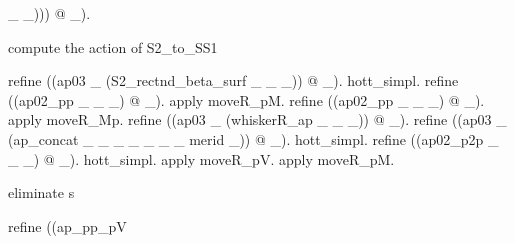 \begin{coqdoccode}
\begin{coqdoccomment}
\_\coqdocindent{0.50em}
\_)))\coqdocindent{0.50em}
@\coqdocindent{0.50em}
\_).\coqdoceol
\coqdoceol
\coqdocindent{1.00em}
\begin{coqdoccomment}
\coqdocindent{0.50em}
compute\coqdocindent{0.50em}
the\coqdocindent{0.50em}
action\coqdocindent{0.50em}
of\coqdocindent{0.50em}
S2\_to\_SS1\coqdocindent{0.50em}
\end{coqdoccomment}
\coqdoceol
\coqdocindent{1.00em}
refine\coqdocindent{0.50em}
((ap03\coqdocindent{0.50em}
\_\coqdocindent{0.50em}
(S2\_rectnd\_beta\_surf\coqdocindent{0.50em}
\_\coqdocindent{0.50em}
\_\coqdocindent{0.50em}
\_))\coqdocindent{0.50em}
@\coqdocindent{0.50em}
\_).\coqdoceol
\coqdocindent{1.00em}
hott\_simpl.\coqdoceol
\coqdocindent{1.00em}
refine\coqdocindent{0.50em}
((ap02\_pp\coqdocindent{0.50em}
\_\coqdocindent{0.50em}
\_\coqdocindent{0.50em}
\_)\coqdocindent{0.50em}
@\coqdocindent{0.50em}
\_).\coqdocindent{0.50em}
apply\coqdocindent{0.50em}
moveR\_pM.\coqdoceol
\coqdocindent{1.00em}
refine\coqdocindent{0.50em}
((ap02\_pp\coqdocindent{0.50em}
\_\coqdocindent{0.50em}
\_\coqdocindent{0.50em}
\_)\coqdocindent{0.50em}
@\coqdocindent{0.50em}
\_).\coqdocindent{0.50em}
apply\coqdocindent{0.50em}
moveR\_Mp.\coqdoceol
\coqdocindent{1.00em}
refine\coqdocindent{0.50em}
((ap03\coqdocindent{0.50em}
\_\coqdocindent{0.50em}
(whiskerR\_ap\coqdocindent{0.50em}
\_\coqdocindent{0.50em}
\_\coqdocindent{0.50em}
\_))\coqdocindent{0.50em}
@\coqdocindent{0.50em}
\_).\coqdoceol
\coqdocindent{1.00em}
refine\coqdocindent{0.50em}
((ap03\coqdocindent{0.50em}
\_\coqdocindent{0.50em}
(ap\_concat\coqdocindent{0.50em}
\_\coqdocindent{0.50em}
\_\coqdocindent{0.50em}
\_\coqdocindent{0.50em}
\_\coqdocindent{0.50em}
\_\coqdocindent{0.50em}
\_\coqdocindent{0.50em}
\_\coqdocindent{0.50em}
merid\coqdocindent{0.50em}
\_))\coqdocindent{0.50em}
@\coqdocindent{0.50em}
\_).\coqdoceol
\coqdocindent{1.00em}
hott\_simpl.\coqdoceol
\coqdocindent{1.00em}
refine\coqdocindent{0.50em}
((ap02\_p2p\coqdocindent{0.50em}
\_\coqdocindent{0.50em}
\_\coqdocindent{0.50em}
\_)\coqdocindent{0.50em}
@\coqdocindent{0.50em}
\_).\coqdocindent{0.50em}
hott\_simpl.\coqdocindent{0.50em}
apply\coqdocindent{0.50em}
moveR\_pV.\coqdocindent{0.50em}
apply\coqdocindent{0.50em}
moveR\_pM.\coqdoceol
\coqdoceol
\coqdocindent{1.00em}
\begin{coqdoccomment}
\coqdocindent{0.50em}
eliminate\coqdocindent{0.50em}
s\coqdocindent{0.50em}
\end{coqdoccomment}
\coqdoceol
\coqdocindent{1.00em}
refine\coqdocindent{0.50em}
((ap\_pp\_pV\coqdocindent{0.50em}

\end{coqdoccomment}
\end{coqdoccode}

